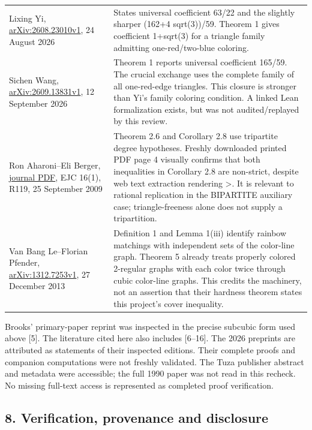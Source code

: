 \documentclass[11pt]{article}
\begin{document}
{\begin{longtable}[]{@{}
  >{\raggedright\arraybackslash}p{}
  >{\raggedright\arraybackslash}p{}@{}}
Lixing Yi, \href{https://arxiv.org/html/2608.23010v1}{arXiv:2608.23010v1}, 24 August 2026 & States universal coefficient 63/22 and the slightly sharper (162+4 sqrt(3))/59. Theorem 1 gives coefficient 1+sqrt(3) for a triangle family admitting one-red/two-blue coloring. \\
Sichen Wang, \href{https://arxiv.org/html/2609.13831v1}{arXiv:2609.13831v1}, 12 September 2026 & Theorem 1 reports universal coefficient 165/59. The crucial exchange uses the complete family of all one-red-edge triangles. This closure is stronger than Yi's family coloring condition. A linked Lean formalization exists, but was not audited/replayed by this review. \\
Ron Aharoni--Eli Berger, \href{https://www.combinatorics.org/ojs/index.php/eljc/article/download/v16i1r119/pdf/}{journal PDF}, EJC 16(1), R119, 25 September 2009 & Theorem 2.6 and Corollary 2.8 use tripartite degree hypotheses. Freshly downloaded printed PDF page 4 visually confirms that both inequalities in Corollary 2.8 are non-strict, despite web text extraction rendering \textgreater. It is relevant to rational replication in the BIPARTITE auxiliary case; triangle-freeness alone does not supply a tripartition. \\
Van Bang Le--Florian Pfender, \href{https://arxiv.org/pdf/1312.7253v1}{arXiv:1312.7253v1}, 27 December 2013 & Definition 1 and Lemma 1(iii) identify rainbow matchings with independent sets of the color-line graph. Theorem 5 already treats properly colored 2-regular graphs with each color twice through cubic color-line graphs. This credits the machinery, not an assertion that their hardness theorem states this project's cover inequality. \\
\end{longtable}
}

Brooks' primary-paper reprint was inspected in the precise subcubic form used above {[}5{]}. The literature cited here also includes {[}6--16{]}. The 2026 preprints are attributed as statements of their inspected editions. Their complete proofs and companion computations were not freshly validated. The Tuza publisher abstract and metadata were accessible; the full 1990 paper was not read in this recheck. No missing full-text access is represented as completed proof verification.

\subsection{8. Verification, provenance and disclosure}\label{verification-provenance-and-disclosure}
\end{document}
